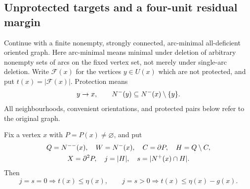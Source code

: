 \subsection{Unprotected targets and a four-unit residual margin}

Continue with a finite nonempty, strongly connected, arc-minimal
all-deficient oriented graph. Here arc-minimal means minimal under
deletion of arbitrary nonempty sets of arcs on the fixed vertex set,
not merely under single-arc deletion.
Write $\mathcal F(x)$ for the vertices $y\in U(x)$ which are not
protected, and put $t(x)=|\mathcal F(x)|$. Protection means
\[
 y\to x,\qquad N^-(y)\subseteq N^-(x)\setminus\{y\}.
\]
All neighbourhoods, convenient orientations, and protected pairs below
refer to the original graph.

\begin{lemma}
\label{lem:unprotected-envelope}
Fix a vertex $x$ with $P=P(x)\ne\varnothing$, and put
\[
 \begin{gathered}
 Q=N^{--}(x),\quad W=N^-(x),\quad C=\partial P,\quad H=Q\setminus C,\\
 X=\partial^2P,\quad j=|H|,\quad s=|N^+(x)\cap H|.
 \end{gathered}
\]
Then
\[
 j=s=0\Longrightarrow t(x)\le\eta(x),\qquad
 j=s>0\Longrightarrow t(x)\le\eta(x)-g(x).
\]
\end{lemma}
